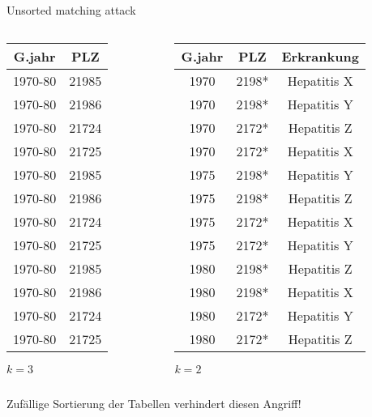 \begin{frame} {Unsorted matching attack}

	\begin{columns}[T] 
	     \begin{column}[T]{0.5\textwidth} 
			\centering
			\small
			\begin{tabular}{|c|c|}
			\hline \textbf{G.jahr} & \textbf{PLZ} \\
			\hline 1970-80 & 21985 \\ 
			\hline 1970-80 & 21986 \\ 
			\hline 1970-80 & 21724 \\ 
			\hline 1970-80 & 21725 \\ 
			\hline \rowcolor{svsgrau1}1970-80 & 21985 \\ 
			\hline 1970-80 & 21986 \\ 
			\hline 1970-80 & 21724 \\ 
			\hline 1970-80 & 21725 \\ 
			\hline 1970-80 & 21985 \\ 
			\hline 1970-80 & 21986 \\ 
			\hline 1970-80 & 21724 \\ 
			\hline 1970-80 & 21725 \\ 
			\hline 
			\end{tabular}
			\vspace{0.3cm}

			\(k = 3\)
	     \end{column}
	
	     \begin{column}[T]{0.5\textwidth} 
			\centering
			\small
			\begin{tabular}{|c|c|c|}
			\hline \textbf{G.jahr} & \textbf{PLZ} & \textbf{Erkrankung} \\
			\hline 1970 & 2198* & Hepatitis X \\ 
			 1970 & 2198* & Hepatitis Y \\ 
			\hline 1970 & 2172* & Hepatitis Z \\ 
			 1970 & 2172* & Hepatitis X \\ 
			\hline \rowcolor{svsgrau1} 1975 & 2198* & Hepatitis Y \\ 
			 1975 & 2198* & Hepatitis Z \\ 
			\hline 1975 & 2172* & Hepatitis X \\ 
			 1975 & 2172* & Hepatitis Y \\ 
			\hline 1980 & 2198* & Hepatitis Z \\ 
			 1980 & 2198* & Hepatitis X \\ 
			\hline 1980 & 2172* & Hepatitis Y \\ 
			 1980 & 2172* & Hepatitis Z \\ 
			\hline 
			\end{tabular}
			\vspace{0.3cm}

			\(k = 2\)
	     \end{column}
     \end{columns}
	
	\vspace{0.5cm}
	\centering
	Zufällige Sortierung der Tabellen verhindert diesen Angriff!
\end{frame}


